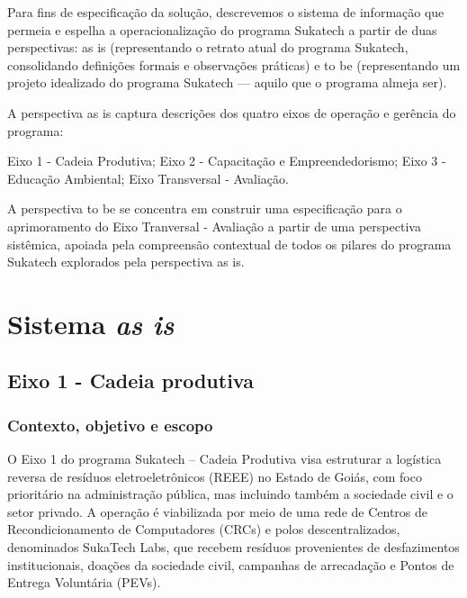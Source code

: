 \documentclass[
	12pt,				%
	openright,			%
	twoside,			%
	a4paper,			%
	english,			%
	french,				%
	spanish,			%
	brazil,				%
	]{abntex2}
\begin{document}
Para fins de especificação da solução, descrevemos o sistema de informação que permeia e espelha a operacionalização do programa Sukatech a partir de duas perspectivas: as is (representando o retrato atual do programa Sukatech, consolidando definições formais e observações práticas) e to be (representando um projeto idealizado do programa Sukatech — aquilo que o programa almeja ser).

A perspectiva as is captura descrições dos quatro eixos de operação e gerência do programa:

    Eixo 1 - Cadeia Produtiva;
    Eixo 2 - Capacitação e Empreendedorismo;
    Eixo 3 - Educação Ambiental;
    Eixo Transversal - Avaliação.

A perspectiva to be se concentra em construir uma especificação para o aprimoramento do Eixo Tranversal - Avaliação a partir de uma perspectiva sistêmica, apoiada pela compreensão contextual de todos os pilares do programa Sukatech explorados pela perspectiva as is.


\part{Sistema \textit{as is}}


\chapter{Eixo 1 - Cadeia produtiva}

\section{Contexto, objetivo e escopo}

O Eixo 1 do programa Sukatech – Cadeia Produtiva visa estruturar a logística reversa de resíduos eletroeletrônicos (REEE) no Estado de Goiás, com foco prioritário na administração pública, mas incluindo também a sociedade civil e o setor privado. A operação é viabilizada por meio de uma rede de Centros de Recondicionamento de Computadores (CRCs) e polos descentralizados, denominados SukaTech Labs, que recebem resíduos provenientes de desfazimentos institucionais, doações da sociedade civil, campanhas de arrecadação e Pontos de Entrega Voluntária (PEVs).
\end{document}
